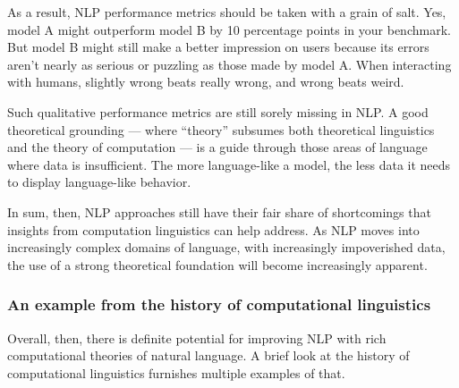 As a result, NLP performance metrics should be taken with a grain of salt.
Yes, model A might outperform model B by 10 percentage points in your benchmark.
But model B might still make a better impression on users because its errors aren't nearly as serious or puzzling as those made by model A\@.
When interacting with humans, slightly wrong beats really wrong, and wrong beats weird.

Such qualitative performance metrics are still sorely missing in NLP.
A good theoretical grounding --- where ``theory'' subsumes both theoretical linguistics and the theory of computation --- is a guide through those areas of language where data is insufficient.
The more language-like a model, the less data it needs to display language-like behavior.

In sum, then, NLP approaches still have their fair share of shortcomings that insights from computation linguistics can help address.
As NLP moves into increasingly complex domains of language, with increasingly impoverished data, the use of a strong theoretical foundation will become increasingly apparent.


\subsubsection{An example from the history of computational linguistics}
\label{sub:formal_arguments_practical_history}

Overall, then, there is definite potential for improving NLP with rich computational theories of natural language.
A brief look at the history of computational linguistics furnishes multiple examples of that.


